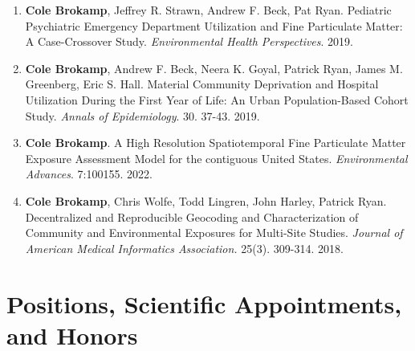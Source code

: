\documentclass{nihbiosketch}
\begin{document}
\begin{statement}
\begin{enumerate}

  \item \textbf{Cole Brokamp}, Jeffrey R. Strawn, Andrew F. Beck, Pat Ryan.
    Pediatric Psychiatric Emergency Department Utilization and Fine
    Particulate Matter: A Case-Crossover Study. \textit{Environmental Health
      Perspectives}. 2019.

  \item \textbf{Cole Brokamp}, Andrew F. Beck, Neera K. Goyal, Patrick Ryan,
    James M. Greenberg, Eric S. Hall. Material Community Deprivation and
    Hospital Utilization During the First Year of Life: An Urban
    Population-Based Cohort Study. \textit{Annals of Epidemiology}. 30. 37-43.
    2019.

  \item \textbf{Cole Brokamp}. A High Resolution Spatiotemporal Fine Particulate Matter Exposure Assessment Model for the contiguous United States. \textit{Environmental Advances}. 7:100155. 2022.

  \item \textbf{Cole Brokamp}, Chris Wolfe, Todd Lingren, John Harley, Patrick Ryan. Decentralized and Reproducible Geocoding and Characterization of Community and Environmental Exposures for Multi-Site Studies. \textit{Journal of American Medical Informatics Association.} 25(3). 309-314. 2018.



\end{enumerate}

\end{statement}

\section{Positions, Scientific Appointments, and Honors}
\end{document}
